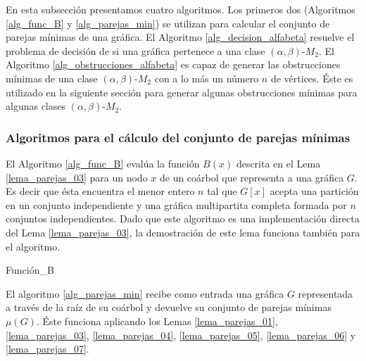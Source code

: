 En esta subsección presentamos cuatro algoritmos. Los primeros dos (Algoritmos \ref{alg_func_B} y \ref{alg_parejas_min}) se utilizan para calcular el conjunto de parejas mínimas de una gráfica. El Algoritmo \ref{alg_decision_alfabeta} resuelve el problema de decisión de si una gráfica pertenece a una clase $(\alpha,\beta)$-$M_2$. El Algoritmo \ref{alg_obstrucciones_alfabeta} es capaz de generar las obstrucciones mínimas de una clase $(\alpha,\beta)$-$M_2$ con a lo más un número $n$ de vértices. Éste es utilizado en la siguiente sección para generar algunas obstrucciones mínimas para algunas clases $(\alpha,\beta)$-$M_2$.

\subsubsection{Algoritmos para el cálculo del conjunto de parejas mínimas}

El Algoritmo \ref{alg_func_B} evalúa la función $B(x)$ descrita en el Lema \ref{lema_parejas_03} para un nodo $x$ de un coárbol que representa a una gráfica $G$. Es decir que ésta encuentra el menor entero $n$ tal que $G[x]$ acepta una partición en un conjunto independiente y una gráfica multipartita completa formada por  $n$ conjuntos independientes. Dado que este algoritmo es una implementación directa del Lema \ref{lema_parejas_03}, la demostración de este lema funciona también para el algoritmo. 

\begin{algorithm}[ht!]
\caption{Función\_B}
\label{alg_func_B}
\DontPrintSemicolon %


\end{algorithm}

El algoritmo \ref{alg_parejas_min} recibe como entrada una gráfica $G$ representada a través de la raíz de su coárbol y devuelve su conjunto de parejas mínimas $\mu(G)$. Éste funciona aplicando los Lemas \ref{lema_parejas_01}, \ref{lema_parejas_03}, \ref{lema_parejas_04}, \ref{lema_parejas_05}, \ref{lema_parejas_06} y \ref{lema_parejas_07}. 

